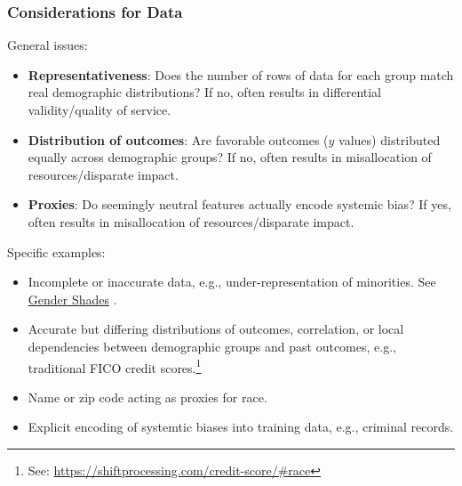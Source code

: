 \documentclass[11pt,aspectratio=169,hyperref={colorlinks}]{beamer}
\begin{document}
		\begin{frame}				
		
			\frametitle{Considerations for Data}

			\noindent \small General issues:\\
			\begin{itemize}\scriptsize
				\item\textbf{Representativeness}: Does the number of rows of data for each group match real demographic distributions? If no, often results in differential validity/quality of service.
				\item \textbf{Distribution of outcomes}: Are favorable outcomes ($y$ values) distributed equally across demographic groups? If no, often results in misallocation of resources/disparate impact. 
				\item \textbf{Proxies}: Do seemingly neutral features actually encode systemic bias? If yes, often results in misallocation of resources/disparate impact.   			
			\end{itemize}
			
			\noindent \small Specific examples:\\
			\begin{itemize}\scriptsize
				\item Incomplete or inaccurate data, e.g., under-representation of minorities. See \href{http://gendershades.org/}{Gender Shades} \cite{gender_shades}.
				\item Accurate but differing distributions of outcomes, correlation, or local dependencies between demographic groups and past outcomes, e.g., traditional FICO credit scores.\footnote{\scriptsize{See: \url{https://shiftprocessing.com/credit-score/\#race}}}
				\item Name or zip code acting as proxies for race.
				\item Explicit encoding of systemtic biases into training data, e.g., criminal records.
			\end{itemize}

		\end{frame}
\end{document}
